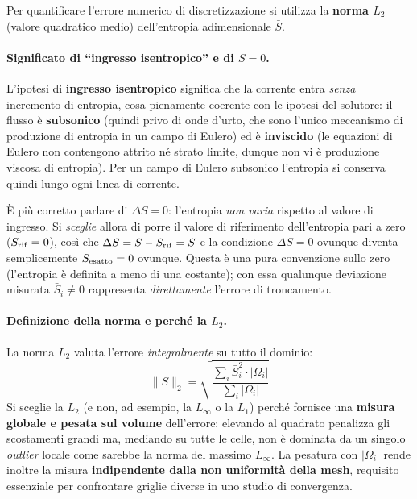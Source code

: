 Per quantificare l'errore numerico di discretizzazione si utilizza la \textbf{norma
$L_2$} (valore quadratico medio) dell'entropia adimensionale $\bar{S}$.

\paragraph{Significato di ``ingresso isentropico'' e di $S=0$.}
L'ipotesi di \textbf{ingresso isentropico} significa che la corrente entra \emph{senza}
incremento di entropia, cosa pienamente coerente con le ipotesi del solutore: il flusso
è \textbf{subsonico} (quindi privo di onde d'urto, che sono l'unico meccanismo di
produzione di entropia in un campo di Eulero) ed è \textbf{inviscido} (le equazioni di
Eulero non contengono attrito né strato limite, dunque non vi è produzione viscosa di
entropia). Per un campo di Eulero subsonico l'entropia si conserva quindi lungo ogni
linea di corrente.

È più corretto parlare di \textbf{$\Delta S = 0$}: l'entropia \emph{non varia} rispetto
al valore di ingresso. Si \emph{sceglie} allora di porre il valore di riferimento
dell'entropia pari a zero ($S_{\rm rif}=0$), così che $\Delta S = S - S_{\rm rif} = S$ e
la condizione $\Delta S = 0$ ovunque diventa semplicemente $S_{\rm esatto}=0$ ovunque.
Questa è una pura convenzione sullo zero (l'entropia è definita a meno di una costante);
con essa qualunque deviazione misurata $\bar S_i \ne 0$ rappresenta \emph{direttamente}
l'errore di troncamento.

\paragraph{Definizione della norma e perché la $L_2$.}
La norma $L_2$ valuta l'errore \emph{integralmente} su tutto il dominio:
\begin{equation}
  \|\bar{S}\|_2 = \sqrt{\frac{\displaystyle\sum_i \bar{S}_i^2 \cdot |\Omega_i|}
                              {\displaystyle\sum_i |\Omega_i|}}
  \label{eq:norma_entropia}
\end{equation}
Si sceglie la $L_2$ (e non, ad esempio, la $L_\infty$ o la $L_1$) perché fornisce una
\textbf{misura globale e pesata sul volume} dell'errore: elevando al quadrato penalizza
gli scostamenti grandi ma, mediando su tutte le celle, non è dominata da un singolo
\emph{outlier} locale come sarebbe la norma del massimo $L_\infty$. La pesatura con
$|\Omega_i|$ rende inoltre la misura \textbf{indipendente dalla non uniformità della
mesh}, requisito essenziale per confrontare griglie diverse in uno studio di
convergenza.

